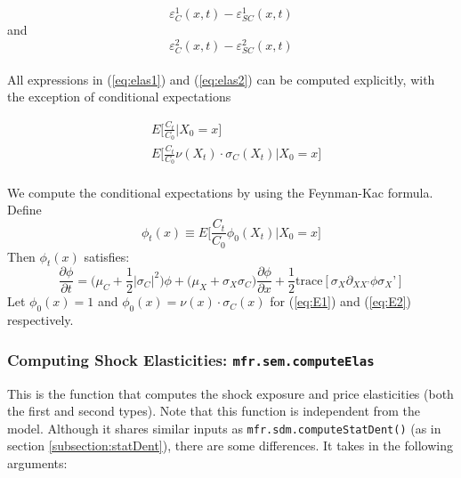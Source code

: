 \documentclass[12pt]{article}
\newcommand{\sdmProg}{mfr.sdm\xspace}
\newcommand{\semProg}{mfr.sem\xspace}
\begin{document}
\begin{equation}
\varepsilon_C^1 (x,t) - \varepsilon_{SC}^1 (x,t) \label{eq:tgt1}
\end{equation}
and
\begin{equation}
\varepsilon_C^2 (x,t) - \varepsilon_{SC}^2 (x,t) \label{eq:tgt2}
\end{equation} \\

All expressions in (\ref{eq:elas1}) and (\ref{eq:elas2})  can be computed explicitly, with the exception of conditional expectations

\begin{align}
& E \Big[ \frac{C_t}{C_0}   | X_0=x \Big] \label{eq:E1} \\
& E \Big[ \frac{C_t}{C_0} \nu(X_t) \cdot \sigma_C (X_t)  | X_0=x \Big]  \label{eq:E2}
\end{align}\\

We compute the conditional expectations by using the Feynman-Kac formula. \\

Define
$$ \phi_t (x) \equiv E \Big[ \frac{C_t}{C_0} \phi_0(X_t)  | X_0=x \Big] $$
Then $ \phi_t(x) $ satisfies:
\begin{equation}
\label{eq:PDE}
\frac{\partial \phi}{\partial t} = \Big( \mu_C + \frac{1}{2} |\sigma_C|^2 \Big) \phi + \Big( \mu_X + \sigma_X \sigma_C \Big)  \frac{\partial \phi}{\partial x} + \frac{1}{2} \text{trace}[ \sigma_X \partial_{X X’} \phi \sigma_X’ ] 
\end{equation}
Let $\phi_0(x) = 1$ and $\phi_0(x) = \nu(x) \cdot \sigma_C(x) $ for (\ref{eq:E1}) and (\ref{eq:E2}) respectively.


\subsubsection{Computing Shock Elasticities: \texttt{\semProg.computeElas}}\label{sec:1}
This is the function that computes the shock exposure and price elasticities
(both the first and second types). Note that this function is independent from
the \citet{HKT} model. Although it shares similar inputs as \texttt{\sdmProg.computeStatDent()} (as in section \ref{subsection:statDent}), there are some differences. It takes in the following arguments:
\end{document}
